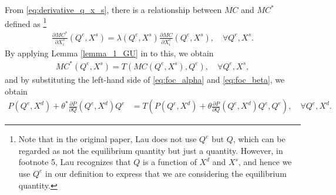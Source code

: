 \documentclass[11pt, a4paper]{article}
\theoremstyle{remark}
\begin{document}
From \eqref{eq:derivative_q_x_s}, there is a relationship between $MC$ and $MC^{*}$ defined as
\footnote{
    Note that in the original paper, Lau does not use $Q^e$ but $Q$, which can be regarded as not the equilibrium quantity but just a quantity.
    However, in footnote 5, Lau recognizes that $Q$ is a function of $X^{d}$ and $X^{s}$, and hence we use $Q^e$ in our definition to express that we are considering the equilibrium quantity.
}
\begin{align}
    \frac{\partial MC^{*}}{\partial X^{s}_{i}}(Q^e, X^{s}) = \lambda(Q^e, X^{s})\frac{\partial MC}{\partial X^{s}_{i}}(Q^e, X^{s}), \quad \forall Q^e, X^{s}. \label{eq:derivative_q_x_s_la}
\end{align}
By applying Lemma \ref{lemma_1_GU} in \citet{goldmanNote1964} to this, we obtain
\begin{align}
    MC^{*}(Q^e, X^{s}) = T\left(MC(Q^e, X^{s}), Q^e\right), \quad \forall Q^e, X^{s}, \label{eq:transformation_T_mc_la}
\end{align}
and by substituting the left-hand side of \eqref{eq:foc_alpha} and \eqref{eq:foc_beta}, we obtain 
\begin{align}
    P(Q^e, X^{d}) + \theta^{*} \frac{\partial P}{\partial Q}(Q^e, X^{d}) Q^e & = T\left(P(Q^e, X^{d}) + \theta \frac{\partial P}{\partial Q}(Q^e, X^{d}) Q^e, Q^e\right), \quad \forall Q^e, X^{d}.\label{eq:transformation_T_demand_la}
\end{align}
\end{document}
